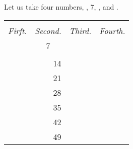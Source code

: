 \documentclass[12pt,preview]{standalone}
\begin{document}
\begin{minipage}{\textwidth}
    Let us take four numbers, {\color{cred}{8}}, 7, {\color{cblue}{10}}, and {\color{cyellow}{9}}.

    \hfill

    \begin{center}
        \begin{tabular}{ |c|c|c|c| }
            \hline
            \hfill                                    & \hfill                     & \hfill                                     & \hfill                                       \\
            \textit{Firſt.}                           & \textit{Second.}           & \textit{Third.}                            & \textit{Fourth.}                             \\
            {\color{cred}{8}}                         & 7                          & {\color{cblue}{10}}                        & {\color{cyellow}{9}}                         \\
            \hfill                                    & \hfill                     & \hfill                                     & \hfill                                       \\
            \hline
            \multicolumn{1}{|r|}{{\color{cred}{16}}}  & \multicolumn{1}{|r|}{14}   & \multicolumn{1}{|r|}{{\color{cblue}{20}}}  & \multicolumn{1}{|r|}{{\color{cyellow}{18}}}  \\
            \multicolumn{1}{|r|}{{\color{cred}{24}}}  & \multicolumn{1}{|r|}{21}   & \multicolumn{1}{|r|}{{\color{cblue}{30}}}  & \multicolumn{1}{|r|}{{\color{cyellow}{27}}}  \\
            \multicolumn{1}{|r|}{{\color{cred}{32}}}  & \multicolumn{1}{|r|}{28}   & \multicolumn{1}{|r|}{{\color{cblue}{40}}}  & \multicolumn{1}{|r|}{{\color{cyellow}{36}}}  \\
            \multicolumn{1}{|r|}{{\color{cred}{40}}}  & \multicolumn{1}{|r|}{35}   & \multicolumn{1}{|r|}{{\color{cblue}{50}}}  & \multicolumn{1}{|r|}{{\color{cyellow}{45}}}  \\
            \multicolumn{1}{|r|}{{\color{cred}{48}}}  & \multicolumn{1}{|r|}{42}   & \multicolumn{1}{|r|}{{\color{cblue}{60}}}  & \multicolumn{1}{|r|}{{\color{cyellow}{54}}}  \\
            \multicolumn{1}{|r|}{{\color{cred}{56}}}  & \multicolumn{1}{|r|}{49}   & \multicolumn{1}{|r|}{{\color{cblue}{70}}}  & \multicolumn{1}{|r|}{{\color{cyellow}{63}}}  \\

\end{tabular}
\end{center}
\end{minipage}
\end{document}
